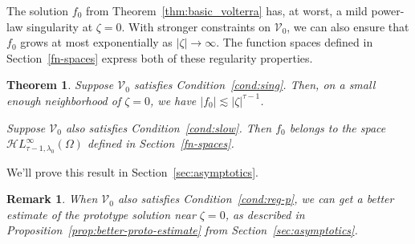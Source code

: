 \documentclass{article}
\theoremstyle{plain}
\newtheorem{thm}{Theorem}
\newtheorem{rmk}{Remark}
\newcommand{\singexp}[2]{\mathcal{H}L^\infty_{#1, #2}}
\newcommand{\volterra}{\mathcal{V}}
\newcommand{\hardpart}{\mathcal{V}_0}
\newcommand{\softpart}{\mathcal{V}_\star}
\newcommand{\solproto}{f_0}
\newcommand{\domain}{\Omega}
\begin{document}
The solution $\solproto$ from Theorem~\ref{thm:basic_volterra} has, at worst, a mild power-law singularity at $\zeta = 0$. With stronger constraints on $\hardpart$, we can also ensure that $\solproto$ grows at most exponentially as $|\zeta| \to \infty$. The function spaces defined in Section~\ref{fn-spaces} express both of these regularity properties.
\begin{thm}\label{thm:proto-growth}
Suppose $\hardpart$ satisfies {\em Condition~\eqref{cond:sing}}. Then, on a small enough neighborhood of $\zeta = 0$, we have $|\solproto| \lesssim |\zeta|^{\tau-1}$.

Suppose $\hardpart$ also satisfies {\em Condition~\eqref{cond:slow}}. Then $f_0$ belongs to the space $\singexp{\tau-1}{\lambda_0}(\domain)$ defined in Section~\ref{fn-spaces}.
\end{thm}
We'll prove this result in Section~\ref{sec:asymptotics}.
\begin{rmk}
When $\hardpart$ also satisfies Condition~\eqref{cond:reg-p}, we can get a better estimate of the prototype solution near $\zeta = 0$, as described in Proposition~\ref{prop:better-proto-estimate} from Section~\ref{sec:asymptotics}.
\end{rmk}
\color{black}



\end{document}
